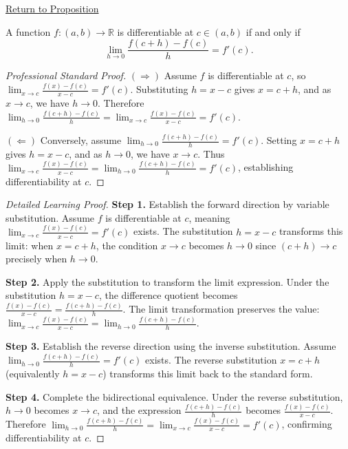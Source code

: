 \newpage
{}
\label{prf:increment-definition-derivative}

\begin{remark*}[Return]
\hyperref[prop:derivative-h-form-equivalence]{Return to Proposition}
\end{remark*}

\begin{theorem*}
A function $f: (a,b) \to \mathbb{R}$ is differentiable at $c \in (a,b)$ if and only if 
\[ \lim_{h \to 0} \frac{f(c+h) - f(c)}{h} = f'(c). \]
\end{theorem*}

\begin{proof}[Professional Standard Proof]
\LRAProofBodyStart
$(\Rightarrow)$ Assume $f$ is differentiable at $c$, so $\lim_{x \to c} \frac{f(x) - f(c)}{x - c} = f'(c)$. Substituting $h = x - c$ gives $x = c + h$, and as $x \to c$, we have $h \to 0$. Therefore $\lim_{h \to 0} \frac{f(c+h) - f(c)}{h} = \lim_{x \to c} \frac{f(x) - f(c)}{x - c} = f'(c)$.

$(\Leftarrow)$ Conversely, assume $\lim_{h \to 0} \frac{f(c+h) - f(c)}{h} = f'(c)$. Setting $x = c + h$ gives $h = x - c$, and as $h \to 0$, we have $x \to c$. Thus $\lim_{x \to c} \frac{f(x) - f(c)}{x - c} = \lim_{h \to 0} \frac{f(c+h) - f(c)}{h} = f'(c)$, establishing differentiability at $c$.
\end{proof}

\begin{proof}[Detailed Learning Proof]
\LRAProofBodyStart

\textbf{Step 1.} Establish the forward direction by variable substitution. Assume $f$ is differentiable at $c$, meaning $\lim_{x \to c} \frac{f(x) - f(c)}{x - c} = f'(c)$ exists. The substitution $h = x - c$ transforms this limit: when $x = c + h$, the condition $x \to c$ becomes $h \to 0$ since $(c + h) \to c$ precisely when $h \to 0$.

\textbf{Step 2.} Apply the substitution to transform the limit expression. Under the substitution $h = x - c$, the difference quotient becomes $\frac{f(x) - f(c)}{x - c} = \frac{f(c + h) - f(c)}{h}$. The limit transformation preserves the value: $\lim_{x \to c} \frac{f(x) - f(c)}{x - c} = \lim_{h \to 0} \frac{f(c + h) - f(c)}{h}$.

\textbf{Step 3.} Establish the reverse direction using the inverse substitution. Assume $\lim_{h \to 0} \frac{f(c+h) - f(c)}{h} = f'(c)$ exists. The reverse substitution $x = c + h$ (equivalently $h = x - c$) transforms this limit back to the standard form.

\textbf{Step 4.} Complete the bidirectional equivalence. Under the reverse substitution, $h \to 0$ becomes $x \to c$, and the expression $\frac{f(c+h) - f(c)}{h}$ becomes $\frac{f(x) - f(c)}{x - c}$. Therefore $\lim_{h \to 0} \frac{f(c+h) - f(c)}{h} = \lim_{x \to c} \frac{f(x) - f(c)}{x - c} = f'(c)$, confirming differentiability at $c$.
\end{proof}

